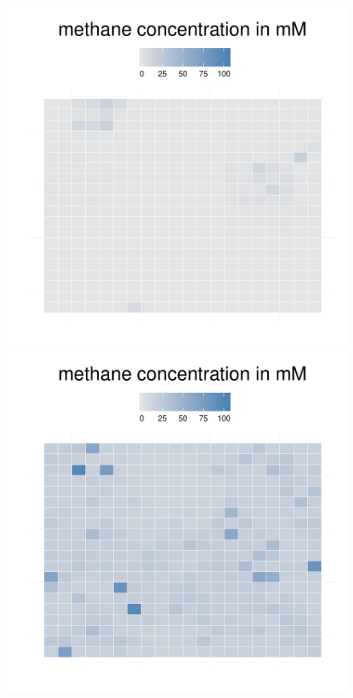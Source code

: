 \begin{figure}[h!]
{\begin{minipage}[t]{0.3\textwidth}
  \end{minipage}
  \begin{minipage}[t]{0.3\textwidth}
    \includegraphics[width=\textwidth]{../results/barkeri_beijerinckii_20x20_seed6764_meth100a.pdf}
  \end{minipage}
  \begin{minipage}[t]{0.3\textwidth}
    \includegraphics[width=\textwidth]{../results/barkeri_beijerinckii_20x20_seed6764_meth150a.pdf}

\end{minipage}}
\end{figure}
